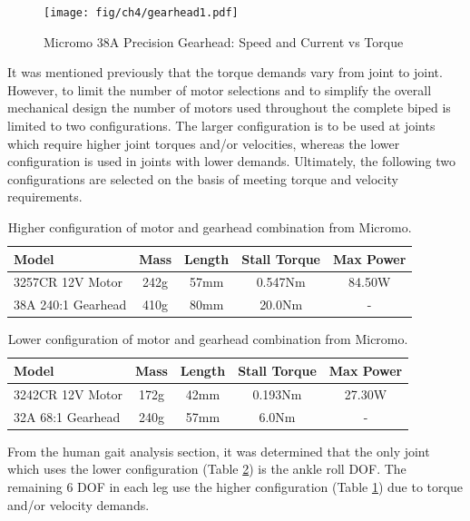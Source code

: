 \begin{figure}[!ht]
	\begin{center}
    \texttt{[image: fig/ch4/gearhead1.pdf]}
	\end{center}
  \caption{Micromo 38A Precision Gearhead: Speed and Current vs Torque}
\end{figure}

It was mentioned previously that the torque demands vary from joint to joint. However, to limit the number of motor selections and to simplify the overall mechanical design the number of motors used throughout the complete biped is limited to two configurations. The larger configuration is to be used at joints which require higher joint torques and/or velocities, whereas the lower configuration is used in joints with lower demands. Ultimately, the following two configurations are selected on the basis of meeting torque and velocity requirements. 


\begin{table}[!h]
  \centering
  \caption{Higher configuration of motor and gearhead combination from Micromo.}
    \begin{tabular}{lcccc}
    \addlinespace
    \toprule
    \textbf{Model} & \textbf{Mass} & \textbf{Length} & \textbf{Stall Torque} & \textbf{Max Power}\\
    \midrule
    3257CR 12V Motor	&	242g	&	57mm	&	0.547Nm		&	84.50W	\\
    38A 240:1 Gearhead	&	410g	&	80mm	&	20.0Nm		&	-	\\
    \bottomrule
    \end{tabular}%
  \label{tab:higherconfig}%
\end{table}%



\begin{table}[!h]
  \centering
  \caption{Lower configuration of motor and gearhead combination from Micromo.}
    \begin{tabular}{lcccc}
    \addlinespace
    \toprule
    \textbf{Model} & \textbf{Mass} & \textbf{Length} & \textbf{Stall Torque} & \textbf{Max Power}\\
    \midrule
    3242CR 12V Motor	&	172g	&	42mm	&	0.193Nm		&	27.30W	\\
    32A 68:1 Gearhead	&	240g	&	57mm	&	6.0Nm		&	-	\\
    \bottomrule
    \end{tabular}%
  \label{tab:lowerconfig}%
\end{table}%


From the human gait analysis section, it was determined that the only joint which uses the lower configuration (Table \ref{tab:lowerconfig}) is the ankle roll DOF. The remaining 6 DOF in each leg use the higher configuration (Table \ref{tab:higherconfig}) due to torque and/or velocity demands.



